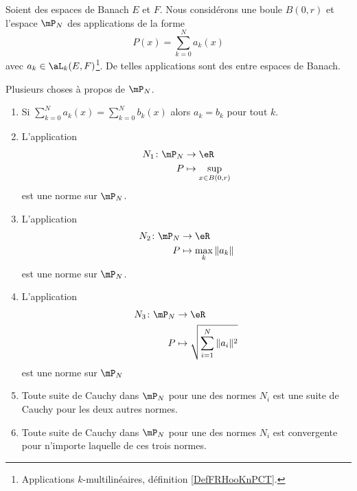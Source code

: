 \begin{propositionDef}	\label{DEFooCJGHooXFTsNf}
	Soient des espaces de Banach \( E\) et \( F\). Nous considérons une boule \( B(0,r)\) et l'espace \( \mP_N\) des applications de la forme
	\begin{equation}
		P(x)=\sum_{k=0}^Na_k(x)
	\end{equation}
	avec \( a_k\in\aL_k(E,F)\)\footnote{Applications \( k\)-multilinéaires, définition \ref{DefFRHooKnPCT}.}. De telles applications sont des  entre espaces de Banach.

	Plusieurs choses à propos de \( \mP_N\).
	\begin{enumerate}
		\item
		      Si \( \sum_{k=0}^Na_k(x)=\sum_{k=0}^Nb_k(x)\) alors \( a_k=b_k\) pour tout \( k\).
		\item
		      L'application
		      \begin{equation}
			      \begin{aligned}
				      N_1\colon \mP_N & \to \eR                    \\
				      P               & \mapsto \sup_{x\in B(0,r)}
			      \end{aligned}
		      \end{equation}
		      est une norme sur \( \mP_N\).
		\item
		      L'application
		      \begin{equation}
			      \begin{aligned}
				      N_2\colon \mP_N & \to \eR                 \\
				      P               & \mapsto \max_k\| a_k \|
			      \end{aligned}
		      \end{equation}
		      est une norme sur \( \mP_N\).
		\item
		      L'application
		      \begin{equation}
			      \begin{aligned}
				      N_3\colon \mP_N & \to \eR                                  \\
				      P               & \mapsto \sqrt{ \sum_{i=1}^N\| a_i \|^2 }
			      \end{aligned}
		      \end{equation}
		      est une norme sur \( \mP_N\)
		\item		\label{ITEMooVVDSooFzRfrT}
		      Toute suite de Cauchy dans \( \mP_N\) pour une des normes \( N_i\) est une suite de Cauchy pour les deux autres normes.
		\item		\label{ITEMooUZQDooNqfNNQ}
		      Toute suite de Cauchy dans \( \mP_N\) pour une des normes \( N_i\) est convergente pour n'importe laquelle de ces trois normes.
	\end{enumerate}
\end{propositionDef}


